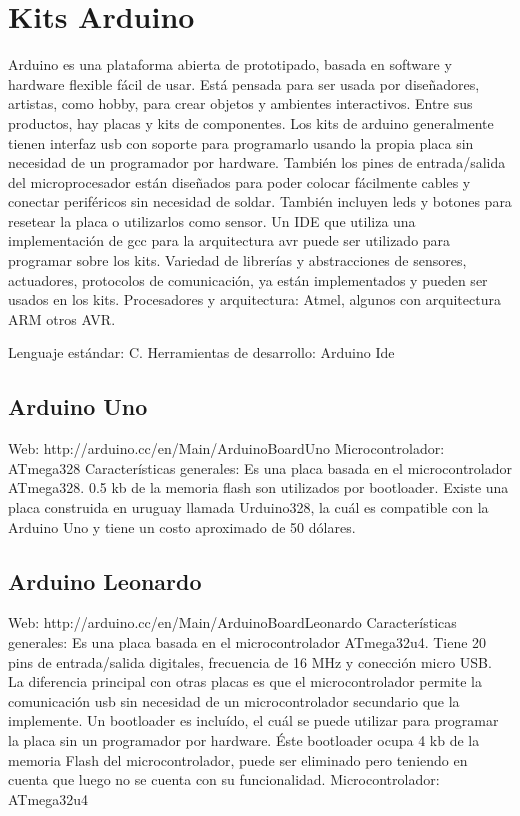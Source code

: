 \section{Kits Arduino}

Arduino es una plataforma abierta de prototipado, basada en software y hardware flexible fácil de usar. Está pensada para ser usada por diseñadores, artistas, como hobby, para crear objetos y ambientes interactivos. Entre sus productos, hay placas y kits de componentes.
Los kits de arduino generalmente tienen interfaz usb con soporte para programarlo usando la propia placa sin necesidad de un programador por hardware. También los pines de entrada/salida del microprocesador están diseñados para poder colocar fácilmente cables y conectar periféricos sin necesidad de soldar.
También incluyen leds y botones para resetear la placa o utilizarlos como sensor.
Un IDE que utiliza una implementación de gcc para la arquitectura
avr puede ser utilizado para programar sobre los kits.
Variedad de librerías y abstracciones de sensores, actuadores,
protocolos de comunicación, ya están implementados y pueden ser usados en los kits.
Procesadores y arquitectura: Atmel, algunos con arquitectura ARM otros AVR.

Lenguaje estándar: C.
Herramientas de desarrollo: Arduino Ide

\subsection{Arduino Uno}
Web: http://arduino.cc/en/Main/ArduinoBoardUno
Microcontrolador: ATmega328
Características generales:
Es una placa basada en el microcontrolador ATmega328.
0.5 kb de la memoria flash son utilizados por bootloader.
Existe una placa construida en uruguay llamada Urduino328,
la cuál es compatible con la Arduino Uno y tiene un costo aproximado de 50 dólares.

\subsection{Arduino Leonardo}
Web:
http://arduino.cc/en/Main/ArduinoBoardLeonardo
Características generales:
Es una placa basada en el microcontrolador ATmega32u4. Tiene 20 pins de entrada/salida digitales, frecuencia de 16 MHz y conección micro USB.
La diferencia principal con otras placas es que el microcontrolador permite la comunicación usb sin necesidad de un microcontrolador secundario que la implemente.
Un bootloader es incluído, el cuál se puede utilizar para programar la placa sin un programador por hardware. Éste bootloader ocupa 4 kb de la memoria Flash del microcontrolador, puede ser eliminado pero teniendo en cuenta que luego no se cuenta con su funcionalidad.
Microcontrolador:
ATmega32u4


